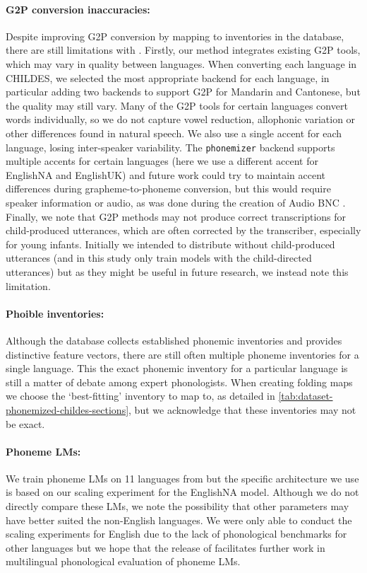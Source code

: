 \paragraph{G2P conversion inaccuracies:} Despite improving G2P conversion by mapping to inventories in the \phoible database, there are still limitations with \gpp. Firstly, our method integrates existing G2P tools, which may vary in quality between languages. When converting each language in CHILDES, we selected the most appropriate backend for each language, in particular adding two backends to support G2P for Mandarin and Cantonese, but the quality may still vary. Many of the G2P tools for certain languages convert words individually, so we do not capture vowel reduction, allophonic variation or other differences found in natural speech. We also use a single accent for each language, losing inter-speaker variability. The \texttt{phonemizer} backend supports multiple accents for certain languages (here we use a different accent for EnglishNA and EnglishUK) and future work could try to maintain accent differences during grapheme-to-phoneme conversion, but this would require speaker information or audio, as was done during the creation of Audio BNC \citep{coleman2012audio}. Finally, we note that G2P methods may not produce correct transcriptions for child-produced utterances, which are often corrected by the transcriber, especially for young infants. Initially we intended to distribute \ipachildes without child-produced utterances (and in this study only train models with the child-directed utterances) but as they might be useful in future research, we instead note this limitation.

\paragraph{Phoible inventories:} Although the \phoible database collects established phonemic inventories and provides distinctive feature vectors, there are still often multiple phoneme inventories for a single language. This the exact phonemic inventory for a particular language is still a matter of debate among expert phonologists. When creating folding maps we choose the `best-fitting' inventory to map to, as detailed in \cref{tab:dataset-phonemized-childes-sections}, but we acknowledge that these inventories may not be exact.

\paragraph{Phoneme LMs:} We train phoneme LMs on 11 languages from \ipachildes but the specific architecture we use is based on our scaling experiment for the EnglishNA model. Although we do not directly compare these LMs, we note the possibility that other parameters may have better suited the non-English languages. We were only able to conduct the scaling experiments for English due to the lack of phonological benchmarks for other languages but we hope that the release of \ipachildes facilitates further work in multilingual phonological evaluation of phoneme LMs.


